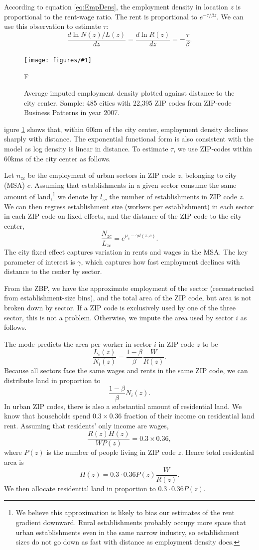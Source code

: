 \documentclass[12pt]{article}
\newcommand{\dofigure}[3]{\begin{figure}
\begin{centering}
\texttt{[image: figures/\#1]}
  \caption{#2\label{fig:#1}}
\end{centering}

\noindent \footnotesize{#3}
\end{figure}}
\begin{document}
According to equation \ref{eq:EmpDens}, the employment density in location $z$ is proportional to the rent-wage ratio. The rent is proportional to $e^{-\tau/\beta z}$. We can use this observation to estimate $\tau$:
\[
\frac{d\ln N(z)/L(z)}{dz} =\frac{d\ln R(z)}{dz} = -\frac{\tau}{\beta}.
\]
\dofigure{nonparametric_gradients}{Average imputed employment density plotted against distance to the city center. Sample: 485 cities with 22,395 ZIP codes from ZIP-code Business Patterns in year 2007.}

Figure \ref{fig:nonparametric_gradients} shows that, within 60km of the city center, employment density declines sharply with distance. The exponential functional form is also consistent with the model as log density is linear in distance. To estimate $\tau$, we use ZIP-codes within 60kms of the city center as follows.

Let $n_{zc}$ be the employment of urban sectors in ZIP code $z$, belonging to city (MSA) $c$.  Assuming that establishments in a given sector consume the same amount of land,\footnote{We believe this approximation is likely to bias our estimates of the rent gradient downward. Rural establishments probably occupy more space that urban establishments even in the same narrow industry, so establishment sizes do not go down as fast with distance as employment density does. } we denote by $l_{zc}$ the number of establishments in ZIP code $z$. We can then regress establishment size (workers per establishment) in each sector in each ZIP code on fixed effects, and the distance of the ZIP code to the city center,
\begin{equation}\label{eq:estimable:gradient}
\frac{N_{zc}}{L_{zc}} = e^{\mu_c-\gamma d(z,c)}.
\end{equation}
The city fixed effect captures variation in rents and wages in the MSA. %
The key parameter of interest is $\gamma$, which captures how fast employment declines with distance to the center by sector.


From the ZBP, we have the approximate employment of the sector (reconstructed from establishment-size bins), and the total area of the ZIP code, but area is not broken down by sector. If a ZIP code is exclusively used by one of the three sector, this is not a problem. Otherwise, we impute the area used by sector $i$ as follows.

The mode predicts the area per worker in sector $i$ in ZIP-code $z$ to be
\[
\frac{L_i(z)}{N_i(z)} = \frac{1-\beta}{\beta}\frac{W}{R(z)}.
\]
Because all sectors face the same wages and rents in the same ZIP code, we can distribute land in proportion to
\[
\frac{1-\beta}{\beta}N_i(z).
\]
In urban ZIP codes, there is also a substantial amount of residential land. We know that households spend $0.3\times 0.36$ fraction of their income on residential land rent. Assuming that residents' only income are wages,
\[
\frac{R(z)H(z)}{WP(z)} = 0.3\times 0.36,
\]
where $P(z)$ is the number of people living in ZIP code $z$. Hence total residential area is
\[
H(z) = 0.3\cdot0.36 P(z) \frac{W}{R(z)}.
\]
We then allocate residential land in proportion to $0.3\cdot0.36 P(z)$.
\end{document}
